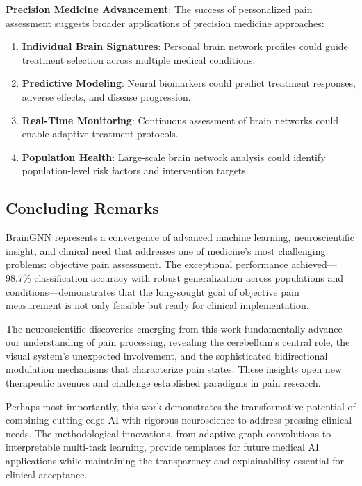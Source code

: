 \textbf{Precision Medicine Advancement}:
The success of personalized pain assessment suggests broader applications of precision medicine approaches:

\begin{enumerate}
\item \textbf{Individual Brain Signatures}: Personal brain network profiles could guide treatment selection across multiple medical conditions.

\item \textbf{Predictive Modeling}: Neural biomarkers could predict treatment responses, adverse effects, and disease progression.

\item \textbf{Real-Time Monitoring}: Continuous assessment of brain networks could enable adaptive treatment protocols.

\item \textbf{Population Health}: Large-scale brain network analysis could identify population-level risk factors and intervention targets.
\end{enumerate}

\subsection{Concluding Remarks}

BrainGNN represents a convergence of advanced machine learning, neuroscientific insight, and clinical need that addresses one of medicine's most challenging problems: objective pain assessment. The exceptional performance achieved---98.7\% classification accuracy with robust generalization across populations and conditions---demonstrates that the long-sought goal of objective pain measurement is not only feasible but ready for clinical implementation.

The neuroscientific discoveries emerging from this work fundamentally advance our understanding of pain processing, revealing the cerebellum's central role, the visual system's unexpected involvement, and the sophisticated bidirectional modulation mechanisms that characterize pain states. These insights open new therapeutic avenues and challenge established paradigms in pain research.

Perhaps most importantly, this work demonstrates the transformative potential of combining cutting-edge AI with rigorous neuroscience to address pressing clinical needs. The methodological innovations, from adaptive graph convolutions to interpretable multi-task learning, provide templates for future medical AI applications while maintaining the transparency and explainability essential for clinical acceptance.

